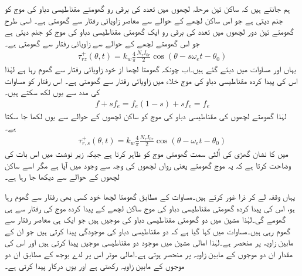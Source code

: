 ہم جانتے ہیں کہ ساکن تین مرحلہ لچھوں میں  تعدد کی برقی رو   گھومتے مقناطیسی دباو کی موج کو جنم دیتی ہے جو اس ساکن لچھے کے حوالے سے   معاصر زاویائی رفتار سے گھومتی ہے۔ اسی طرح گھومتے تین دور لچھوں میں  تعدد کی برقی رو ایک گھومتی مقناطیسی دباو کی موج  کو جنم دیتی ہے جو اس گھومتے لچھے کے حوالے سے   زاویائی رفتار سے گھومتی ہے۔
\begin{align}
\tau_{rz}^+(\theta,t)=k_w \frac{4}{\pi} \frac{N_r I_{0r}}{2} \cos \left(\theta-s \omega_e t -\theta_0 \right)
\end{align}
یہاں   اور  مساوات  میں دیئے گئے ہیں۔اب چونکہ گھومتا لچھا از خود  زاویائی رفتار سے گھوم رہا ہے لہٰذا اس کی پیدا کردہ مقناطیسی دباو کی موج خلاء میں  زاویائی رفتار سے گھومتی ہے۔ اس رفتار کو مساوات   کی مدد سے یوں لکھ سکتے ہیں۔
\begin{align}
f+s f_e= f_e (1-s)+ s f_e=f_e
\end{align}
لہٰذا گھومتے لچھوں کی مقناطیسی دباو کی موج کو ساکن لچھوں کے حوالے سے یوں لکھا جا سکتا ہے۔
\begin{align}\label{مساوات_امالی_گھومتے_حصے_کی_موج}
\tau_{r,s}^+(\theta,t)=k_w \frac{4}{\pi} \frac{N_r I_{0r}}{2} \cos \left(\theta-\omega_e t -\theta_0 \right)
\end{align}
 میں  کا نشان گھڑی کی اُلٹی سمت گھومتی موج کو ظاہر کرتا ہے جبکہ زیر نوشت  میں  اس بات کی وضاحت کرتا ہے کہ یہ موج گھومتے یعنی رواں لچھوں کی وجہ سے وجود میں آیا ہے مگر اسے ساکن لچھوں کے حوالے سے دیکھا جا رہا ہے۔

یہاں وقفہ لے کر ذرا غور کرتے ہیں۔مساوات   کے مطابق گھومتا لچھا خود کسی بھی رفتار سے گھوم رہا ہو، اس کی پیدا کردہ گھومتی مقناطیسی دباو کی موج ساکن لچھے کے پیدا کردہ موج کی رفتار سے ہی گھومے گی۔لہٰذا مشین میں دو گھومتی مقناطیسی دباو کی موجیں ہیں جو ایک ہی معاصر رفتار سے گھوم رہی ہیں۔مساوات   میں کہا گیا ہے کہ دو مقناطیسی دباو کی موجودگی  پیدا کرتی ہیں جو ان کے مابین زاویہ پر منحصر ہے۔لہٰذا امالی مشین میں موجود دو مقناطیسی موجیں  پیدا کرتی ہیں اور اس  کی مقدار ان دو موجوں کے مابین زاویہ پر منحصر ہوتی ہے۔امالی موٹر اس پر لدے بوجھ کے مطابق ان دو موجوں کے مابین زاویہ رکھتی ہے اور یوں درکار  پیدا کرتی ہے۔

